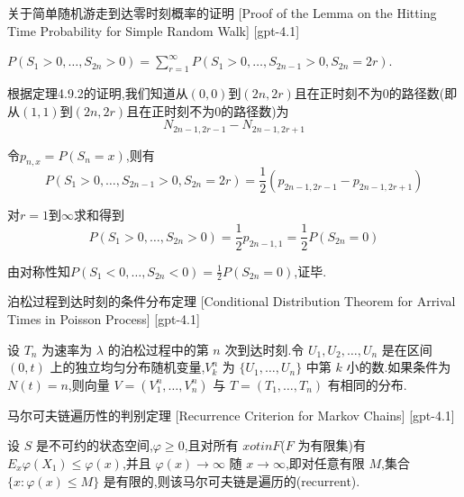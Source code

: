 \documentclass[UTF8]{ctexart}
\begin{document}
    \begin{prf}
        {关于简单随机游走到达零时刻概率的证明}
        [Proof of the Lemma on the Hitting Time Probability for Simple Random Walk]
        [gpt-4.1]
        
$P(S_1 > 0, \ldots, S_{2n} > 0) = \sum_{r=1}^{\infty} P(S_1 > 0, \ldots, S_{2n-1} > 0, S_{2n} = 2r)$.

根据定理4.9.2的证明,我们知道从$(0,0)$到$(2n, 2r)$且在正时刻不为0的路径数(即从$(1,1)$到$(2n, 2r)$且在正时刻不为0的路径数)为
\[
N_{2n-1, 2r-1} - N_{2n-1, 2r+1}
\]

令$p_{n, x} = P(S_n = x)$,则有
\[
P(S_1 > 0, \ldots, S_{2n-1} > 0, S_{2n} = 2r) = \frac{1}{2} (p_{2n-1, 2r-1} - p_{2n-1, 2r+1})
\]

对$r=1$到$\infty$求和得到
\[
P(S_1 > 0, \ldots, S_{2n} > 0) = \frac{1}{2} p_{2n-1, 1} = \frac{1}{2} P(S_{2n} = 0)
\]

由对称性知$P(S_1 < 0, \ldots, S_{2n} < 0) = \frac{1}{2} P(S_{2n} = 0)$,证毕.

    \end{prf}
    
    
    
    \begin{thm}
        {泊松过程到达时刻的条件分布定理}
        [Conditional Distribution Theorem for Arrival Times in Poisson Process]
        [gpt-4.1]
        
设 $T_n$ 为速率为 $\lambda$ 的泊松过程中的第 $n$ 次到达时刻.令 $U_1, U_2, \dots, U_n$ 是在区间 $(0, t)$ 上的独立均匀分布随机变量,$V_k^n$ 为 $\{U_1, \ldots, U_n\}$ 中第 $k$ 小的数.如果条件为 $N(t) = n$,则向量 $V = (V_1^n, \ldots, V_n^n)$ 与 $T = (T_1, \dots, T_n)$ 有相同的分布.

    \end{thm}
    
    
    
    \begin{thm}
        {马尔可夫链遍历性的判别定理}
        [Recurrence Criterion for Markov Chains]
        [gpt-4.1]
        
设 $S$ 是不可约的状态空间,$\varphi \geq 0$,且对所有 $x 
otin F$($F$ 为有限集)有 $E_{x} \varphi (X_{1}) \leq \varphi(x)$,并且 $\varphi(x) \to \infty$ 随 $x \to \infty$,即对任意有限 $M$,集合 $\{ x : \varphi(x) \leq M \}$ 是有限的,则该马尔可夫链是遍历的(recurrent).

    \end{thm}
    
\end{document}
